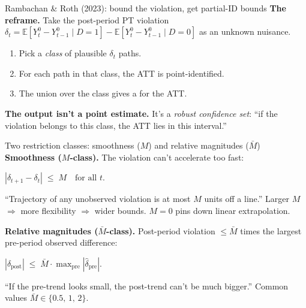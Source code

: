 \documentclass[aspectratio=169,11pt]{beamer}
\begin{document}
\begin{frame}{Rambachan \& Roth (2023): bound the violation, get partial-ID bounds}
\vspace{0.5em}
\textbf{The reframe.} \;Take the post-period PT violation $\delta_t = \mathbb{E}[Y^0_t - Y^0_{t-1} \mid D{=}1] - \mathbb{E}[Y^0_t - Y^0_{t-1} \mid D{=}0]$ as an unknown nuisance.

\vspace{0.5em}
\begin{enumerate}\small
  \item Pick a \textit{class} of plausible $\delta_t$ paths.
  \item For each path in that class, the ATT is point-identified.
  \item The union over the class gives a  for the ATT.
\end{enumerate}

\vspace{0.5em}
\textbf{The output isn't a point estimate.} \;It's a \textit{robust confidence set}: ``if the violation belongs to this class, the ATT lies in this interval.''

\vspace{0.4em}
\end{frame}

\begin{frame}{Two restriction classes: smoothness ($M$) and relative magnitudes ($\bar M$)}
\vspace{0.4em}
\textbf{Smoothness ($M$-class).} \;The violation can't accelerate too fast:
\begin{center}\small
$|\delta_{t+1} - \delta_t| \;\leq\; M \quad\text{for all } t.$
\end{center}
``Trajectory of any unobserved violation is at most $M$ units off a line.'' \;Larger $M$ $\Rightarrow$ more flexibility $\Rightarrow$ wider bounds. \;$M=0$ pins down linear extrapolation.

\vspace{0.6em}
\textbf{Relative magnitudes ($\bar M$-class).} \;Post-period violation $\leq \bar M$ times the largest pre-period observed difference:
\begin{center}\small
$|\delta_{\text{post}}| \;\leq\; \bar M \cdot \max_{\text{pre}}|\widehat{\delta}_{\text{pre}}|.$
\end{center}
``If the pre-trend looks small, the post-trend can't be much bigger.'' \;Common values $\bar M \in \{0.5,\, 1,\, 2\}$.

\vspace{0.3em}
\end{frame}
\end{document}
